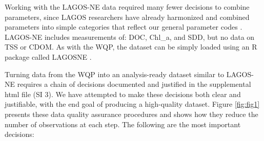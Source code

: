 \documentclass[draft,linenumbers]{agujournal2018}
\begin{document}
Working with the LAGOS-NE data required many fewer decisions to combine
parameters, since LAGOS researchers have already harmonized and combined
parameters into simple categories that reflect our general parameter
codes \citep{Soranno2015,Soranno2017}. LAGOS-NE includes measurements
of: DOC, Chl\_a, and SDD, but no data on TSS or CDOM. As with the WQP,
the dataset can be simply loaded using an R package called LAGOSNE
\citep{Soranno2017}.

Turning data from the WQP into an analysis-ready dataset similar to
LAGOS-NE requires a chain of decisions documented and justified in the
supplemental html file (SI 3). We have attempted to make these decisions
both clear and justifiable, with the end goal of producing a
high-quality dataset. Figure \ref{fig:fig1} presents these data quality
assurance procedures and shows how they reduce the number of
observations at each step. The following are the most important
decisions:
\end{document}
